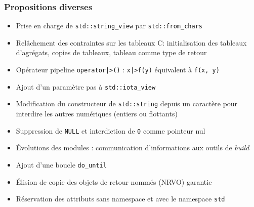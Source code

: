 \documentclass[C++.tex]{subfiles}
\begin{document}
\begin{frame}[fragile]
	\frametitle{Propositions diverses}
	\begin{itemize}
		\item Prise en charge de \lstinline|std::string_view| par \lstinline|std::from_chars|
		\item Relâchement des contraintes sur les tableaux \og C\fg{}: initialisation des tableaux d'agrégats, copies de tableaux, tableau comme type de retour


		\item Opérateur pipeline \lstinline!operator|>()! :  \lstinline!x|>f(y)! équivalent à \lstinline|f(x, y)|
		\item Ajout d'un paramètre \og pas\fg{} à \lstinline|std::iota_view|
		\item Modification du constructeur de \lstinline|std::string| depuis un caractère pour interdire les autres numériques (entiers ou flottants)


		\item Suppression de \lstinline|NULL| et interdiction de \lstinline|0| comme pointeur nul
		\item Évolutions des modules : communication d'informations aux outils de \textit{build}
		\item Ajout d'une boucle \lstinline|do_until|
		\item Élision de copie des objets de retour nommés (NRVO) garantie


		\item Réservation des attributs sans namespace et avec le namespace \lstinline|std|


	\end{itemize}
\end{frame}
\end{document}
